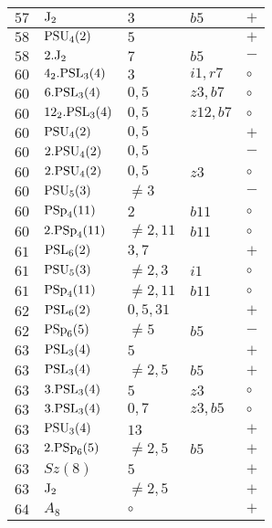 \documentclass[a4paper, 11pt]{article}
\begin{document}
\begin{longtable}{lllll}
		$57$ & ${\rm J}_2$ & $3$ & $b5$ & $+$ \\ \hline
		$58$ & ${\rm PSU}_{4}(2)$ & $5$ &  & $+$ \\ \hline
		$58$ & $2.{\rm J}_2$ & $7$ & $b5$ & $-$ \\ \hline
		$60$ & $4_2.{\rm PSL}_{3}(4)$ & $3$ & $i1, r7$ & $\circ$ \\ \hline
		$60$ & $6.{\rm PSL}_{3}(4)$ & $0,5$ & $z3, b7$ & $\circ$ \\ \hline
		$60$ & $12_2.{\rm PSL}_{3}(4)$ & $0,5$ & $z12, b7$ & $\circ$ \\ \hline
		$60$ & ${\rm PSU}_{4}(2)$ & $0,5$ &  & $+$ \\ \hline
		$60$ & $2.{\rm PSU}_{4}(2)$ & $0,5$ &  & $-$ \\ \hline
		$60$ & $2.{\rm PSU}_{4}(2)$ & $0,5$ & $z3$ & $\circ$ \\ \hline
		$60$ & ${\rm PSU}_{5}(3)$ & $\neq 3$ &  & $-$ \\ \hline
		$60$ & ${\rm PSp}_{4}(11)$ & $2$ & $b11$ & $\circ$ \\ \hline
		$60$ & $2.{\rm PSp}_{4}(11)$ & $\neq 2,11$ & $b11$ & $\circ$ \\ \hline
		$61$ & ${\rm PSL}_{6}(2)$ & $3,7$ &  & $+$ \\ \hline
		$61$ & ${\rm PSU}_{5}(3)$ & $\neq 2,3$ & $i1$ & $\circ$ \\ \hline
		$61$ & ${\rm PSp}_{4}(11)$ & $\neq 2,11$ & $b11$ & $\circ$ \\ \hline
		$62$ & ${\rm PSL}_{6}(2)$ & $0,5,31$ &  & $+$ \\ \hline
		$62$ & ${\rm PSp}_{6}(5)$ & $\neq 5$ & $b5$ & $-$ \\ \hline
		$63$ & ${\rm PSL}_{3}(4)$ & $5$ &  & $+$ \\ \hline
		$63$ & ${\rm PSL}_{3}(4)$ & $\neq 2,5$ & $b5$ & $+$ \\ \hline
		$63$ & $3.{\rm PSL}_{3}(4)$ & $5$ & $z3$ & $\circ$ \\ \hline
		$63$ & $3.{\rm PSL}_{3}(4)$ & $0,7$ & $z3, b5$ & $\circ$ \\ \hline
		$63$ & ${\rm PSU}_{3}(4)$ & $13$ &  & $+$ \\ \hline
		$63$ & $2.{\rm PSp}_{6}(5)$ & $\neq 2,5$ & $b5$ & $+$ \\ \hline
		$63$ & $Sz(8)$ & $5$ &  & $+$ \\ \hline
		$63$ & ${\rm J}_2$ & $\neq 2,5$ &  & $+$ \\ \hline
		$64$ & $A_{8}$ & $\circ$ &  & $+$ \\ \hline

\end{longtable}
\end{document}

